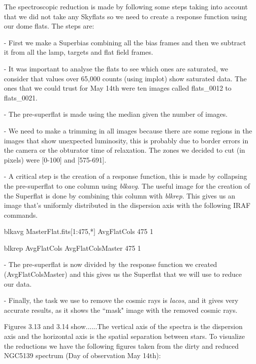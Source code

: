 The spectroscopic reduction is made by following some steps taking into account that we did not take any Skyflats so we need to create a response function using our dome flats. The steps are:

- First we make a Superbias combining all the bias frames and then we subtract it from all the lamp, targets and flat field frames.

- It was important to analyse the flats to see which ones are saturated, we consider that values over 65,000 counts (using implot) show saturated data. The ones that we could trust for May 14th were ten images called flats\_0012 to flats\_0021.

- The pre-superflat is made using the median given the number of images.

- We need to make a trimming in all images because there are some regions in the images that show unexpected luminosity, this is probably due to border errors in the camera or the obturator time of relaxation. The zones we decided to cut (in pixels) were [0-100] and [575-691].  

- A critical step is the creation of a response function, this is made by collapsing the pre-superflat to one column using \textit{blkavg}. The useful image for the creation of the Superflat is done by combining this column with \textit{blkrep}. This gives us an image that's uniformly distributed in the dispersion axis with the following IRAF commands.

blkavg MasterFlat.fits[1:475,*] AvgFlatCols 475 1

blkrep AvgFlatCols AvgFlatColsMaster 475 1

- The pre-superflat is now divided by the response function we created (AvgFlatColsMaster) and this gives us the Superflat that we will use to reduce our data.

- Finally, the task we use to remove the cosmic rays is \textit{lacos}, and it gives very accurate results, as it shows the ``mask" image with the removed cosmic rays.

Figures 3.13 and 3.14 show......The vertical axis of the spectra is the dispersion axis and the horizontal axis is the spatial separation between stars. To visualize the reductions we have the following figures taken from the dirty and reduced NGC5139 spectrum (Day of observation May 14th):


